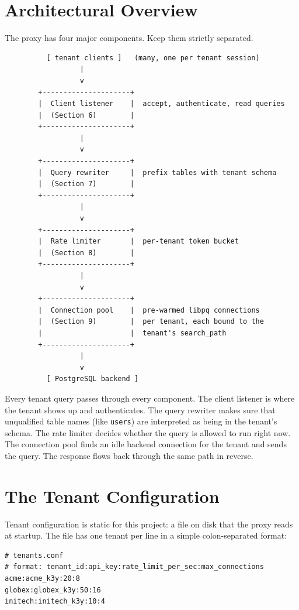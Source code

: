 \documentclass[11pt,a4paper]{article}
\begin{document}
\section{Architectural Overview}

The proxy has four major components. Keep them strictly separated.

\begin{codebox}
\begin{lstlisting}
          [ tenant clients ]   (many, one per tenant session)
                  |
                  v
        +---------------------+
        |  Client listener    |  accept, authenticate, read queries
        |  (Section 6)        |
        +---------------------+
                  |
                  v
        +---------------------+
        |  Query rewriter     |  prefix tables with tenant schema
        |  (Section 7)        |
        +---------------------+
                  |
                  v
        +---------------------+
        |  Rate limiter       |  per-tenant token bucket
        |  (Section 8)        |
        +---------------------+
                  |
                  v
        +---------------------+
        |  Connection pool    |  pre-warmed libpq connections
        |  (Section 9)        |  per tenant, each bound to the
        |                     |  tenant's search_path
        +---------------------+
                  |
                  v
          [ PostgreSQL backend ]
\end{lstlisting}
\end{codebox}

Every tenant query passes through every component. The client listener is where the tenant shows up and authenticates. The query rewriter makes sure that unqualified table names (like \texttt{users}) are interpreted as being in the tenant's schema. The rate limiter decides whether the query is allowed to run right now. The connection pool finds an idle backend connection for the tenant and sends the query. The response flows back through the same path in reverse.

\section{The Tenant Configuration}

Tenant configuration is static for this project: a file on disk that the proxy reads at startup. The file has one tenant per line in a simple colon-separated format:

\begin{codebox}
\begin{lstlisting}
# tenants.conf
# format: tenant_id:api_key:rate_limit_per_sec:max_connections
acme:acme_k3y:20:8
globex:globex_k3y:50:16
initech:initech_k3y:10:4
\end{lstlisting}
\end{codebox}
\end{document}
